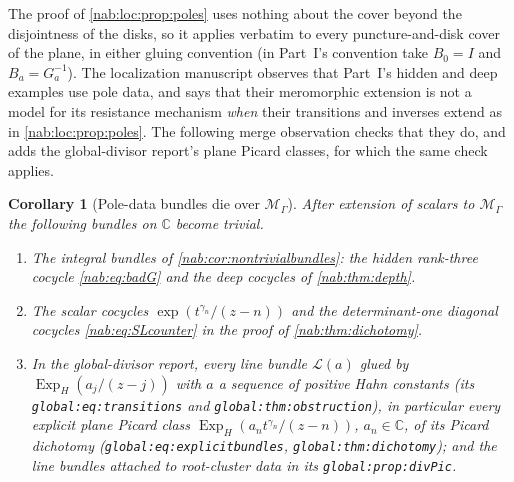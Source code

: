\documentclass[11pt,letterpaper]{article}
\newtheorem{corollary}[corollary]{Corollary}
\theoremstyle{definition}
\theoremstyle{remark}
\newcommand{\C}{\mathbb C}
\newcommand{\MM}{\mathscr M_\Gamma}
\numberwithin{equation}{section}
\begin{document}
The proof of \cref{nab:loc:prop:poles} uses nothing about the cover beyond
the disjointness of the disks, so it applies verbatim to every
puncture-and-disk cover of the plane, in either gluing convention (in Part~I's
convention take $B_0=I$ and $B_a=G_a^{-1}$). The localization manuscript
observes that Part~I's hidden and deep examples use pole data, and says that
their meromorphic extension is not a model for its resistance mechanism
\emph{when} their transitions and inverses extend as in
\cref{nab:loc:prop:poles}. The following merge observation checks that they
do, and adds the global-divisor report's plane Picard classes, for which the
same check applies.

\begin{corollary}[Pole-data bundles die over $\MM$]\label{nab:loc:cor:polestrivial}
After extension of scalars to $\MM$ the following bundles on $\C$ become
trivial.
\begin{enumerate}[label=\textup{(\alph*)}]
\item The integral bundles of \cref{nab:cor:nontrivialbundles}: the hidden
rank-three cocycle \eqref{nab:eq:badG} and the deep cocycles of
\cref{nab:thm:depth}.
\item The scalar cocycles $\exp(t^{\gamma_n}/(z-n))$ and the determinant-one
diagonal cocycles \eqref{nab:eq:SLcounter} in the proof of
\cref{nab:thm:dichotomy}.
\item In the global-divisor report, every line bundle $\mathcal L(a)$ glued by
$\operatorname{Exp}_H(a_j/(z-j))$ with $a$ a sequence of positive Hahn
constants (its \texttt{global:eq:transitions} and
\texttt{global:thm:obstruction}), in particular every explicit plane Picard
class $\operatorname{Exp}_H(a_nt^{\gamma_n}/(z-n))$, $a_n\in\C$, of its
Picard dichotomy (\texttt{global:eq:explicitbundles},
\texttt{global:thm:dichotomy}); and the line bundles attached to root-cluster
data in its \texttt{global:prop:divPic}.
\end{enumerate}
\end{corollary}
\end{document}
